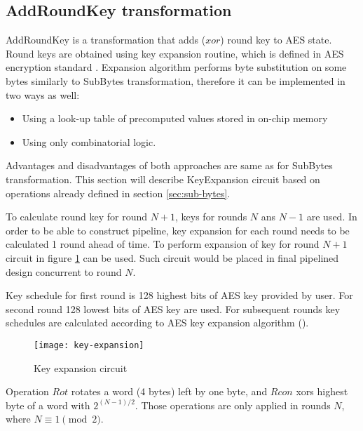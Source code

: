 \subsection{AddRoundKey transformation}

AddRoundKey is a transformation that adds ($xor$) round key to AES state. Round keys are obtained using key expansion routine, which is defined in AES encryption standard \cite{aes-standard}. Expansion algorithm performs byte substitution on some bytes similarly to SubBytes transformation, therefore it can be implemented in two ways as well:

\begin{itemize}[nolistsep]
\item Using a look-up table of precomputed values stored in on-chip memory
\item Using only combinatorial logic.
\end{itemize}

Advantages and disadvantages of both approaches are same as for SubBytes transformation. This section will describe KeyExpansion circuit based on operations already defined in section \ref{sec:sub-bytes}.

To calculate round key for round $N + 1$, keys for rounds $N$ ans $N - 1$ are used. In order to be able to construct pipeline, key expansion for each round needs to be calculated 1 round ahead of time. To perform expansion of key for round $N + 1$ circuit in figure \ref{fig:key-expansion} can be used. Such circuit would be placed in final pipelined design concurrent to round $N$.

Key schedule for first round is 128 highest bits of AES key provided by user. For second round 128 lowest bits of AES key are used. For subsequent rounds key schedules are calculated according to AES key expansion algorithm (\cite{aes-standard}).

\begin{figure}[!h]
\centering
\texttt{[image: key-expansion]}
\caption{Key expansion circuit}
\label{fig:key-expansion}
\end{figure}

Operation $Rot$ rotates a word (4 bytes) left by one byte, and $Rcon$ xors highest byte of a word with $2^{(N - 1)/2}$. Those operations are only applied in rounds $N$, where $N \equiv 1 \pmod{2}$.

